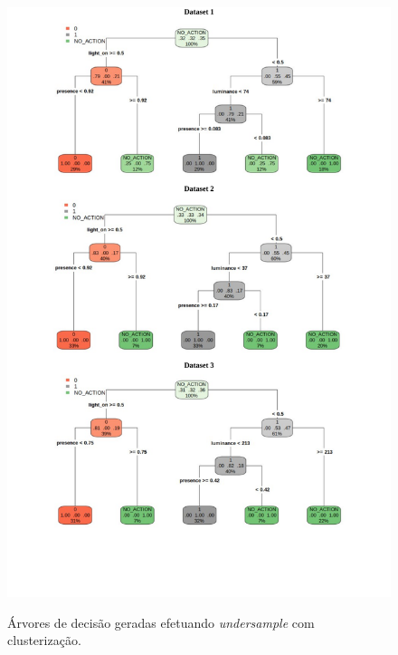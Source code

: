 \begin{figure}[hp]
	\centering
	\caption{Árvores de decisão geradas efetuando \textit{undersample} com clusterização.}
  \includegraphics[width=\textwidth]{imagens/teste_learning/6.pdf}
  \label{fig:teste_6}  
\end{figure}

\clearpage


